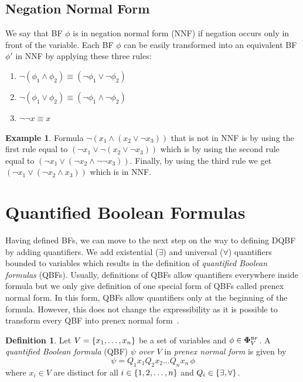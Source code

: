 \documentclass[
  digital, %
  twoside, %
  table,   %
  nolof,     %
  nolot,     %
]{fithesis3}
\let\setbuilder\set
\newcommand{\simpleset}[1]{\{{#1}\}}
\renewcommand{\set}[1]{\normalexpandarg\IfSubStr{#1}{|}{\setbuilder{#1}}{\simpleset{#1}}}
\theoremstyle{definition}
\newtheorem{definition}{Definition}
\newtheorem{example}{Example}
\theoremstyle{remark}
\newcommand{\BF}[1]{\mathbf{\Phi}_{#1}^{\normalfont{\text{\tiny BF}}}}
\newcommand{\itholds}{\,}
\begin{document}
\subsection{Negation Normal Form}
\label{sec:BF:NNF}
We say that BF $\phi$ is in negation normal form (NNF) if negation occurs only in front of the variable. Each BF $\phi$ can be easily transformed into an equivalent BF $\phi'$ in NNF by applying these three rules:
\begin{enumerate}
    \item $\neg(\phi_1 \land \phi_2) \equiv (\neg\phi_1 \lor \neg\phi_2)$ 
    \item $\neg(\phi_1 \lor \phi_2) \equiv (\neg\phi_1 \land \neg\phi_2)$
    \item $\neg\neg x \equiv x$
\end{enumerate}
\begin{example}
Formula $\neg (x_1 \land (x_2 \lor \neg x_3))$ that is not in NNF is by using the first rule equal to $(\neg x_1 \lor \neg(x_2 \lor \neg x_3))$ which is by using the second rule equal to $(\neg x_1 \lor (\neg x_2 \land \neg\neg x_3))$. Finally, by using the third rule we get $(\neg x_1 \lor (\neg x_2 \land x_3))$ which is in NNF.
\end{example}

\section{Quantified Boolean Formulas}
Having defined BFs, we can move to the next step on the way to defining DQBF by adding quantifiers. We add existential (${\exists}$) and universal (${\forall}$) quantifiers bounded to variables which results in the definition of \emph{quantified Boolean formulas} (QBFs). Usually, definitions of QBFs allow quantifiers everywhere inside formula but we only give definition of one special form of QBFs called prenex normal form. In this form, QBFs allow quantifiers only at the beginning of the formula. However, this does not change the expressibility as it is possible to transform every QBF into prenex normal form~\cite{prenexingQBFs}.

\begin{definition}
Let $V = \set{x_1,\dots,x_n}$ be a set of variables and $\phi \in \BF{V}$. A \emph{quantified Boolean formula} (QBF) $\psi$ \emph{over $V$} in \emph{prenex normal form} is given by
\[\psi = Q_1 x_1 Q_2 x_2 \dots Q_n x_n \itholds \phi\]
where $x_i \in V$ are distinct for all $i \in \set{1,2,\dots,n}$ and $Q_i \in \set{{\exists}, {\forall}}$.
\label{def:QBF}
\end{definition}
\end{document}
